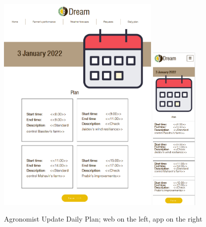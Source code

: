 \documentclass{article}
\begin{document}
        \begin{figure} [h]
            \centering
            \includegraphics[width=0.7\textwidth]{images/UserInterfaces/Agronomist/DailyPlan/UpdateWeb.png}
            \quad
            \includegraphics[width=0.2\textwidth]{images/UserInterfaces/Agronomist/DailyPlan/UpdateApp.png}
            \quad
            \caption{\label{fig:agronomistDPUpdate}Agronomist Update Daily Plan; web on the left, app on the right}
        \end{figure}
        \newpage
\end{document}
